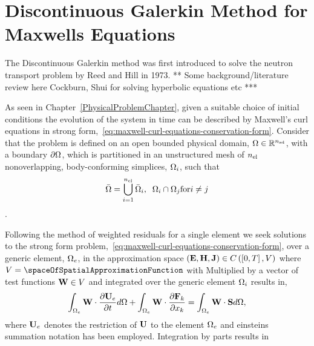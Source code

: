 \chapter{Discontinuous Galerkin Method for Maxwells Equations} %
\label{Chapter3}

The Discontinuous Galerkin method was first introduced to solve the neutron transport problem by Reed and Hill \cite{} in 1973.
** Some background/literature review here Cockburn, Shui for solving hyperbolic equations etc ***

As seen in Chapter~\ref{PhysicalProblemChapter}, given a suitable choice of
initial conditions the evolution of the system in time can be described by
Maxwell's curl equations in strong
form,~\eqref{eq:maxwell-curl-equations-conservation-form}. Consider that the problem is defined on an open bounded physical domain, $\Omega \in \mathbb{R}^{n_\textrm{sd}}$, with a boundary $\partial \Omega$,
which is partitioned in an unstructured mesh of $n_\textrm{el}$ nonoverlapping, body-conforming simplices, $\Omega_i$, such that
$$
\bar{\Omega} = \mathop{\bigcup}_{i=1}^{n_\textrm{el}} \bar{\Omega}_i, \;\; \Omega_i \cap \Omega_j \textrm{for} i \neq j
$$.

Following the method of weighted residuals for a single element we seek solutions to the strong form problem,~\eqref{eq:maxwell-curl-equations-conservation-form}, over a generic element, $\Omega_e$, in the approximation space $\left( \mathbf{E},\mathbf{H},\mathbf{J} \right) \in C \left( \left[ 0, T \right], V \right)$
where $\approximationSpaceSpatial = \spaceOfSpatialApproximationFunction $ with
Multiplied by a vector of test functions $\mathbf{W} \in V $ and integrated over the generic element $\Omega_i$ results in,
$$
\int_{\Omega_e} \mathbf{W} \cdot \frac{\partial \mathbf{U}_e}{\partial t} d\Omega  + \int_{\Omega_e} \mathbf{W} \cdot \frac{\partial \mathbf{F}_{k}}{\partial x_{k}}= \int_{\Omega_e} \mathbf{W} \cdot \mathbf{S} d\Omega,
$$
where $\mathbf{U}_e$ denotes the restriction of $\mathbf{U}$ to the element $\Omega_e$ and einsteins summation notation has been employed.
Integration by parts results in

